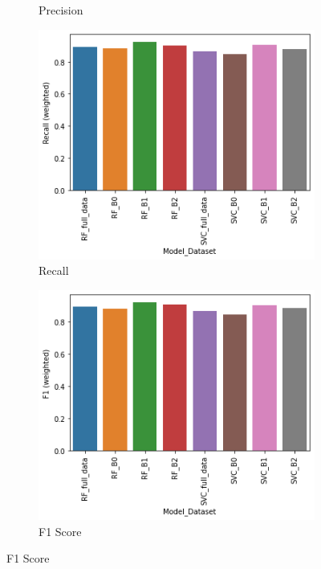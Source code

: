 \documentclass[a4paper,singleside,12pt]{report} %
\begin{document}
\begin{figure}[!htb]
\begin{subfigure}[b]{0.48\linewidth}
			    \caption{Precision}
			  \end{subfigure}
			  \begin{subfigure}[b]{0.48\linewidth}
			    \includegraphics[width=\linewidth]{./figures/Recall (weighted)final_results.png}
			    \caption{Recall}
			  \end{subfigure}
			  \begin{subfigure}[b]{0.48\linewidth}
			    \includegraphics[width=\linewidth]{./figures/F1 (weighted)final_results.png}
			    \caption{F1 Score}
			  \end{subfigure}

\end{figure}
\end{document}
